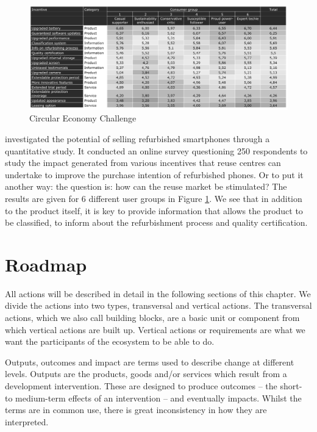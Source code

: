 \documentclass[
]{book}
\begin{document}
\begin{figure}

{\centering \includegraphics[width=1\linewidth]{./figs/1g} 

}

\caption{Circular Economy Challenge}\label{fig:figmugge}
\end{figure}

\citet{Mugge2017} investigated the potential of selling refurbished smartphones through a quantitative study. It conducted an online survey questioning 250 respondents to study the impact generated from various incentives that reuse centres can undertake to improve the purchase intention of refurbished phones. Or to put it another way: the question is: how can the reuse market be stimulated? The results are given for 6 different user groups in Figure \ref{fig:figmugge}. We see that in addition to the product itself, it is key to provide information that allows the product to be classified, to inform about the refurbishment process and quality certification.

\hypertarget{roadmap}{%
\chapter{Roadmap}\label{roadmap}}

All actions will be described in detail in the following sections of this chapter. We divide the actions into two types, transversal and vertical actions. The transversal actions, which we also call building blocks, are a basic unit or component from which vertical actions are built up. Vertical actions or requirements are what we want the participants of the ecosystem to be able to do.

Outputs, outcomes and impact are terms used to describe change at different levels. Outputs are the products, goods and/or services which result from a development intervention. These are designed to produce outcomes -- the short- to medium-term effects of an intervention -- and eventually impacts. Whilst the terms are in common use, there is great inconsistency in how they are interpreted.
\end{document}

